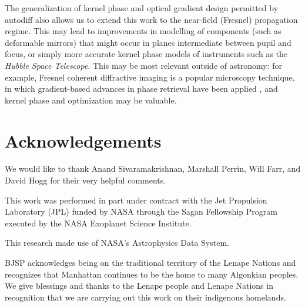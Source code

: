 \documentclass[modern]{aastex63}
\begin{document}
The generalization of kernel phase and optical gradient design permitted by autodiff also allows us to extend this work to the near-field (Fresnel) propagation regime. This may lead to improvements in modelling of components (such as deformable mirrors) that might occur in planes intermediate between pupil and focus, or simply more accurate kernel phase models of instruments such as the \textit{Hubble Space Telescope}. This may be most relevant outside of astronomy: for example, Fresnel coherent diffractive imaging \citep{williams2006} is a popular microscopy technique, in which gradient-based advances in phase retrieval have been applied \citep{Dueaay3700}, and kernel phase and optimization may be valuable.

\section*{Acknowledgements} %

We would like to thank Anand Sivaramakrishnan, Marshall Perrin, Will Farr, and David Hogg for their very helpful comments.

This work was performed in part under contract with the Jet Propulsion Laboratory (JPL) funded by NASA through the Sagan Fellowship Program executed by the NASA Exoplanet Science Institute. 

This research made use of NASA's Astrophysics Data System.

BJSP acknowledges being on the traditional territory of the Lenape Nations and recognizes that Manhattan continues to be the home to many Algonkian peoples. We give blessings and thanks to the Lenape people and Lenape Nations in recognition that we are carrying out this work on their indigenous homelands.
%








\end{document}
